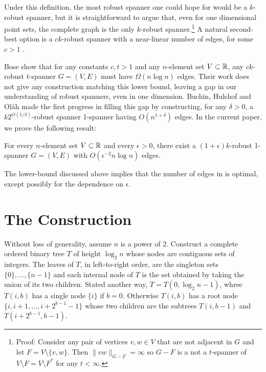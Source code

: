 \documentclass{patmorin}
\begin{document}
Under this definition, the most robust spanner one could hope for
would be a $k$-robust spanner, but it is straightforward to argue
that, even for one dimensional point sets, the complete graph is the
only $k$-robust spanner.\footnote{Proof: Consider any pair of vertices
$v,w\in V$ that are not adjacent in $G$ and let $F=V\setminus\{v,w\}$.
Then $\|vw\|_{G-F}=\infty$ so $G-F$ is a not a $t$-spanner of $V\setminus
F=V\setminus F^*$ for any $t<\infty$.} A natural second-best option is a
$ck$-robust spanner with a near-linear number of edges, for some $c>1$ .

Bose \etal \cite[Theorem~3]{bose.dujmovic.ea:robust} show that for any
constants $c,t>1$ and any $n$-element set $V\subset\mathbb{R}$, any $ck$-robust
$t$-spanner $G=(V,E)$ must have $\Omega(n\log n)$ edges.  Their work
does not give any construction matching this lower bound, leaving a
gap in our understanding of robust spanners, even in one dimension.
Buchin, Hulshof and Ol\'ah \cite{buchin.hulshof.olah:robust} made the
first progress in filling this gap by constructing, for any $\delta>0$,
a $k2^{O(1/\delta)}$-robust spanner 1-spanner having $O(n^{1+\delta})$
edges.  In the current paper, we prove the following result:

\begin{thm}
  For every $n$-element set $V\subset\mathbb{R}$ and every $\epsilon>0$,
  there exist a $(1+\epsilon)k$-robust 1-spanner $G=(V,E)$ with
  $O(\epsilon^{-2}n\log n)$ edges.
\end{thm}

The lower-bound discussed above implies that the number of edges
in  is optimal, except possibly for the dependence on
$\epsilon$.


\section{The Construction}


Without loss of generality, assume $n$ is a power of 2.  Construct a
complete ordered binary tree $T$ of height $\log_2 n$ whose nodes are
contiguous sets of integers.  The leaves of $T$, in left-to-right order,
are the singleton sets $\{0\},\ldots,\{n-1\}$ and each internal node of
$T$ is the set obtained by taking the union of its two children.  Stated
another way, $T=T(0,\log_2 n-1)$, whree $T(i,b)$ has a single node $\{i\}$
if $b=0$. Otherwise $T(i,b)$ has a root node $\{i,i+1,\ldots,i+2^{b-1}-1\}$
whose two children are the subtrees $T(i,b-1)$ and $T(i+2^{b-1}, b-1)$.
\end{document}
